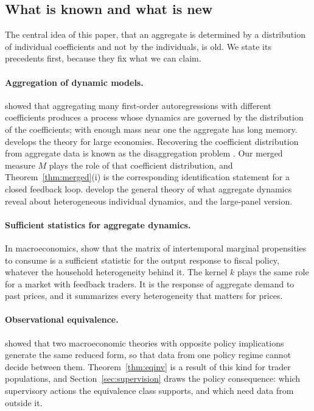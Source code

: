\subsection{What is known and what is new}\label{sec:lit}

The central idea of this paper, that an aggregate is determined by a distribution of individual coefficients and not by the individuals, is old. We state its precedents first, because they fix what we can claim.

\paragraph{Aggregation of dynamic models.} \citet{granger1980} showed that aggregating many first-order autoregressions with different coefficients produces a process whose dynamics are governed by the distribution of the coefficients; with enough mass near one the aggregate has long memory. \citet{zaffaroni2004} develops the theory for large economies. Recovering the coefficient distribution from aggregate data is known as the disaggregation problem \citep{celov2008}. Our merged measure $M$ plays the role of that coefficient distribution, and Theorem~\ref{thm:merged}(i) is the corresponding identification statement for a closed feedback loop. \citet{forni1997} develop the general theory of what aggregate dynamics reveal about heterogeneous individual dynamics, and \citet{pesaran2014} the large-panel version.

\paragraph{Sufficient statistics for aggregate dynamics.} In macroeconomics, \citet{auclert2024} show that the matrix of intertemporal marginal propensities to consume is a sufficient statistic for the output response to fiscal policy, whatever the household heterogeneity behind it. The kernel $k$ plays the same role for a market with feedback traders. It is the response of aggregate demand to past prices, and it summarizes every heterogeneity that matters for prices.

\paragraph{Observational equivalence.} \citet{sargent1976} showed that two macroeconomic theories with opposite policy implications generate the same reduced form, so that data from one policy regime cannot decide between them. Theorem~\ref{thm:eqinv} is a result of this kind for trader populations, and Section~\ref{sec:supervision} draws the policy consequence: which supervisory actions the equivalence class supports, and which need data from outside it.

